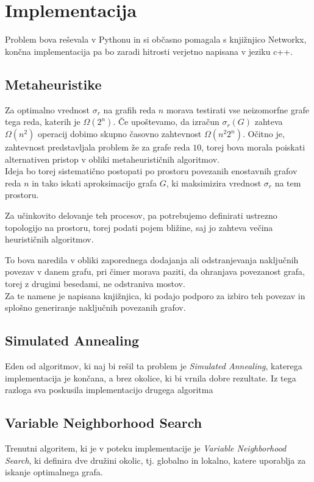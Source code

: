 \documentclass[ letterpaper, titlepage, fleqn]{article}
\begin{document}
\section{Implementacija}
Problem bova reševala v Pythonu in si občasno pomagala s knjižnjico Networkx,
končna implementacija pa bo zaradi hitrosti verjetno napisana v jeziku c++.

\subsection{Metaheuristike}
Za optimalno vrednost $\sigma_r$ na grafih reda $n$ morava testirati vse neizomorfne
grafe tega reda, katerih je $\Omega(2^n)$. Če upoštevamo, da izračun $\sigma_r(G)$ 
zahteva $\Omega(n^2)$ operacij dobimo skupno časovno zahtevnost $\Omega(n^2 2^n)$.
Očitno je, zahtevnost predstavljala problem že za grafe reda $10$, 
torej bova morala poiskati alternativen pristop v obliki metaheurističnih algoritmov. \\

Ideja bo torej sistematično postopati po prostoru povezanih enostavnih grafov reda $n$ in 
tako iskati aproksimacijo grafa $G$, ki maksimizira vrednost $\sigma_r$ na tem prostoru.

Za učinkovito delovanje teh procesov, pa potrebujemo definirati ustrezno topologijo 
na prostoru, torej podati pojem bližine, saj jo zahteva večina heurističnih algoritmov.

To bova naredila v obliki zaporednega dodajanja ali odstranjevanja naključnih povezav v 
danem grafu, pri čimer morava paziti, da ohranjava povezanost grafa, 
torej z drugimi besedami, ne odstraniva mostov.\\
Za te namene je napisana knjižnjica, ki podajo podporo za izbiro teh povezav
in splošno generiranje naključnih povezanih grafov.


\subsection{Simulated Annealing}
Eden od algoritmov, ki naj bi rešil ta problem je {\em Simulated Annealing}, 
katerega implementacija je končana, a brez okolice, ki bi vrnila dobre rezultate.
Iz tega razloga sva poskusila implementacijo drugega algoritma

\subsection{Variable Neighborhood Search}
Trenutni algoritem, ki je v poteku implementacije je {\em Variable Neighborhood Search},
ki definira dve družini okolic, tj. globalno in lokalno, katere uporablja za iskanje optimalnega grafa.
\end{document}
